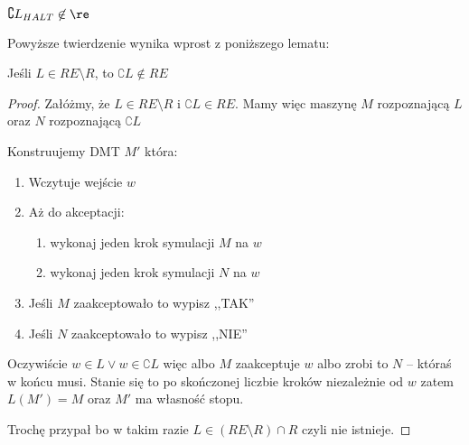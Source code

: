 \begin{theorem}
	\(\complement L_{HALT} \not \in \re\)
\end{theorem}

Powyższe twierdzenie wynika wprost z poniższego lematu:

\begin{lemma}
	Jeśli \( L \in RE \setminus R \), to \( \complement{L} \not \in RE\)
\end{lemma}
\begin{proof}
	Załóżmy, że \( L \in RE \setminus R \) i \( \complement{L} \in RE\).
	Mamy więc maszynę \( M \) rozpoznającą \( L \) oraz \( N \) rozpoznającą \( \complement{L} \)

	Konstruujemy DMT \( M' \) która:
	\begin{enumerate}
		\item Wczytuje wejście \( w \)
		\item Aż do akceptacji:
		      \begin{enumerate}
			      \item wykonaj jeden krok symulacji \( M \) na \( w \)
			      \item wykonaj jeden krok symulacji \( N \) na \( w \)
		      \end{enumerate}
		\item Jeśli \( M \) zaakceptowało to wypisz ,,TAK''
		\item Jeśli \( N \) zaakceptowało to wypisz ,,NIE''
	\end{enumerate}

	Oczywiście \( w \in L \lor w \in \complement{L} \) więc albo \( M \) zaakceptuje \( w \) albo zrobi to \( N \) -- któraś w końcu musi.
	Stanie się to po skończonej liczbie kroków niezależnie od \( w \) zatem \( L(M') = M \) oraz \( M' \) ma własność stopu.

	Trochę przypał bo w takim razie \( L \in (RE \setminus R) \cap R \) czyli nie istnieje.

\end{proof}